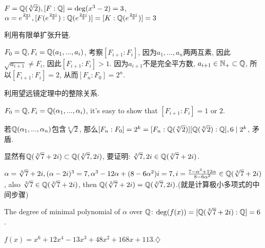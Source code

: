 \documentclass{report}
\begin{document}

\sol
{

    $F=\mathbb{Q}(\sqrt[3]{2}), [F:\mathbb{Q}]=\deg (x^3-2)=3$, $\alpha=e^{\frac{2\pi i}{3}}, [F(e^{\frac{2\pi i}{3}}): \mathbb{Q}(e^{\frac{2\pi i}{3}})]=[K:\mathbb{Q}(e^{\frac{2\pi i}{3}})]=3$
}


\sol
{

    利用有限单扩张升链.

    $F_0=\mathbb{Q}, F_i=\mathbb{Q}(a_1,...,a_i)$, 考察$[F_{i+1}:F_i]$, 因为$a_1,...,a_n$两两互素, 因此$\sqrt{a_{i+1}} \neq F_{i}$, 因此$[F_{i+1}:F_i]>1$. 因为$a_{i+1}$不是完全平方数, $a_{i+1} \in \mathbb{N}_+ \subset \mathbb{Q}$, 所以$[F_{i+1}:F_i]=2$, 从而$[F_n:F_0]=2^n$.
}


\sol
{

    利用望远镜定理中的整除关系.

    $F_0=\mathbb{Q}, F_i=\mathbb{Q}(\alpha_1,...,\alpha_i)$, it's easy to show that $[F_{i+1}:F_i]=1$ or $2$.

    若$\mathbb{Q}(\alpha_1,...,\alpha_n)$包含$\sqrt[6]{2}$, 那么$[F_n:F_0]=2^k=[F_n:\mathbb{Q}(\sqrt[6]{2})][\mathbb{Q}(\sqrt[6]{2}):\mathbb{Q}], 6\mid 2^k$, 矛盾. 
}


\sol
{

    显然有$\mathbb{Q}(\sqrt[3]{7}+2i)\subset \mathbb{Q}(\sqrt[3]{7},2i)$, 要证明: $\sqrt[3]{7},2i \in \mathbb{Q}(\sqrt[3]{7}+2i)$.

    $\alpha=\sqrt[3]{7}+2i, (\alpha-2i)^3=7, \alpha^3-12\alpha+(8-6\alpha^2)i=7, i=\frac{7-\alpha^3+12\alpha}{8-6\alpha^2} \in \mathbb{Q}(\sqrt[3]{7}+2i)$, also $\sqrt[3]{7} \in \mathbb{Q}(\sqrt[3]{7}+2i)$, then $\mathbb{Q}(\sqrt[3]{7}+2i)=\mathbb{Q}(\sqrt[3]{7},2i)$.(就是计算极小多项式的中间步骤)

    The degree of minimal polynomial of $\alpha$ over $\mathbb{Q}$: $\deg(f(x))=[\mathbb{Q}(\sqrt[3]{7}+2i):\mathbb{Q}]=6$.

    $f(x)=x^6+12x^4-13x^3+48x^2+168x+113$.$\diamondsuit$
}
\end{document}
